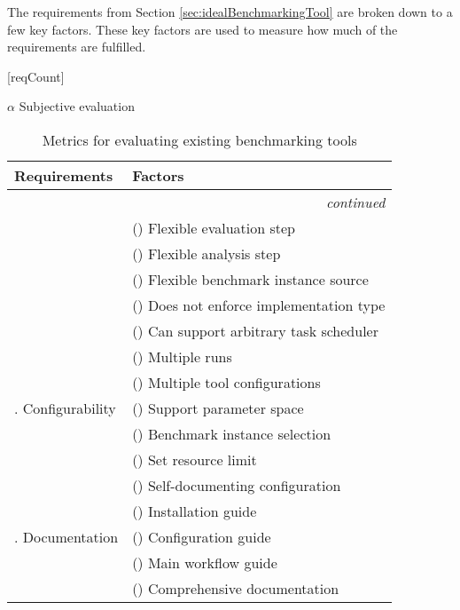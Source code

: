 The requirements from Section \ref{sec:idealBenchmarkingTool} are broken down to a few key factors.
These key factors are used to measure how much of the requirements are fulfilled.

[reqCount]
\newcommand{\reqLabel}[1]{
	\setcounter{reqFactorCount}{0}
	\addtocounter{reqCount}{1}
	\arabic{reqCount}.
	#1
}
\newcommand{\reqFactor}[1]{
	\addtocounter{reqFactorCount}{1}
	(\alph{reqFactorCount}) #1
}

\begin{ThreePartTable}
	\begin{TableNotes}
		\footnotesize
		\item[$\alpha$] Subjective evaluation
	\end{TableNotes}
	\begin{longtable}{ll}

		\textbf{Requirements} & \textbf{Factors} \\
		\toprule
		\endhead

		\multicolumn{2}{r}{\textit{continued}}
		\endfoot

		\bottomrule
		\insertTableNotes\\
		\caption{Metrics for evaluating existing benchmarking tools}
		\endlastfoot

		\multirow{5}{*}{\reqLabel{Extensibility}}
			& \reqFactor{Flexible evaluation step} \\*
			& \reqFactor{Flexible analysis step} \\*
			& \reqFactor{Flexible benchmark instance source} \\*
			& \reqFactor{Does not enforce implementation type} \\*
			& \reqFactor{Can support arbitrary task scheduler} \\*
		\midrule

		\multirow{5}{*}{\reqLabel{Configurability}}
			& \reqFactor{Multiple runs} \\*
			& \reqFactor{Multiple tool configurations} \\*
			& \reqFactor{Support parameter space} \\*
			& \reqFactor{Benchmark instance selection} \\*
			& \reqFactor{Set resource limit} \\*
		\midrule

		\multirow{5}{*}{\reqLabel{Documentation}}
			& \reqFactor{Self-documenting configuration} \\*
			& \reqFactor{Installation guide} \\*
			& \reqFactor{Configuration guide} \\*
			& \reqFactor{Main workflow guide} \\*
			& \reqFactor{Comprehensive documentation\tnote{$\alpha$}} \\*
		\midrule


\end{longtable}
\end{ThreePartTable}
